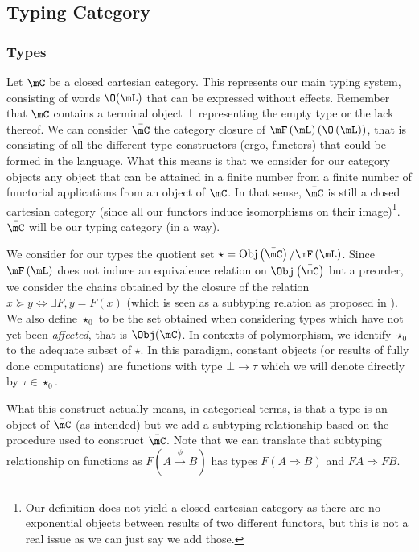 \documentclass[math, english, info]{cours}
\begin{document}
\subsection{Typing Category}\label{subsec:typingcategory}
\subsubsection{Types}\label{subsubsec:types}
Let $\mC$ be a closed cartesian category. This represents our main typing system, consisting of words $\O(\mL)$ that can be expressed without effects.
Remember that $\mC$ contains a terminal object $\bot$ representing the empty type or the lack thereof.
We can consider $\bar{\mC}$ the category closure of $\mF\left( \mL \right)\left(\O\left( \mL \right)\right)$, that is consisting of all the different type constructors (ergo, functors) that could be formed in the language.
What this means is that we consider for our category objects any object that can be attained in a finite number from a finite number of functorial applications from an object of $\mC$.
In that sense, $\bar{\mC}$ is still a closed cartesian category (since all our functors induce isomorphisms on their image)\footnote{Our definition does not yield a closed cartesian category as there are no exponential objects between results of two different functors, but this is not a real issue as we can just say we add those.}.
$\bar{\mC}$ will be our typing category (in a way).

We consider for our types the quotient set $\star = \mathrm{Obj}\left( \bar{\mC} \right)/\mF\left( \mL \right)$.
Since $\mF\left( \mL \right)$ does not induce an equivalence relation on $\Obj\left( \bar{\mC} \right)$ but a preorder, we consider the chains obtained by the closure of the relation $x\succeq y \Leftrightarrow \exists F, y = F(x)$ (which is seen as a subtyping relation as proposed in ).
We also define $\star_{0}$ to be the set obtained when considering types which have not yet been \emph{affected}, that is $\Obj(\mC)$.
In contexts of polymorphism, we identify $\star_{0}$ to the adequate subset of $\star$.
In this paradigm, constant objects (or results of fully done computations) are functions with type $\bot \to \tau$ which we will denote directly by $\tau \in \star_{0}$.

What this construct actually means, in categorical terms, is that a type is an object of $\bar{\mC}$ (as intended) but we add a subtyping relationship based on the procedure used to construct $\bar{\mC}$.
Note that we can translate that subtyping relationship on functions as $F\left( A \xrightarrow{\phi} B \right)$ has types $F\left( A\Rightarrow B \right)$ and $FA \Rightarrow FB$.
\end{document}
